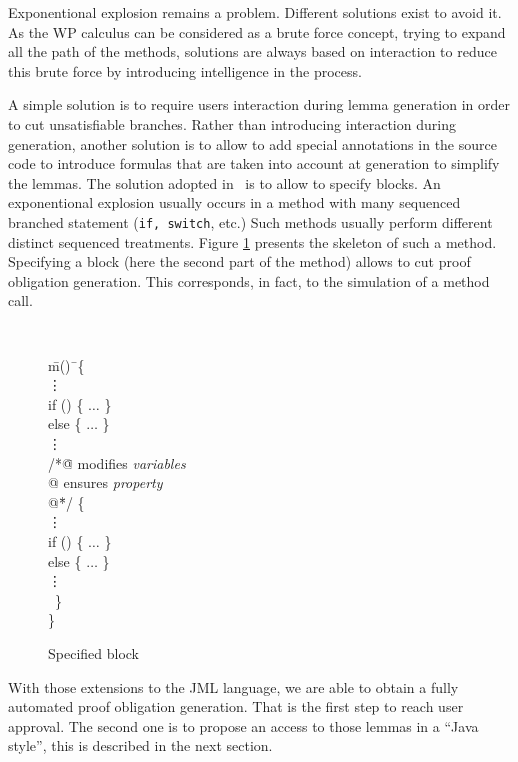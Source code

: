 Exponentional explosion remains a problem.  Different solutions exist
 to avoid it.  As the WP calculus can be considered as a brute
 force concept, trying to expand all the path of the methods,
 solutions are always based on interaction to reduce this brute force
 by introducing intelligence in the process.

 A simple solution is to require users interaction during lemma
 generation in order to cut unsatisfiable branches.  Rather than introducing
 interaction during generation, another solution is to allow to add
 special annotations in the source code to introduce formulas that are
 taken into account at generation to simplify the lemmas.
 The solution adopted in \JACK\ is to allow to specify blocks. An exponentional explosion usually occurs
in a method with many sequenced branched statement ({\tt if, switch}, etc.) Such methods usually perform
different distinct sequenced treatments.
 Figure \ref{Specified_block} presents the skeleton of such a method. Specifying a block (here the second part
of the method) allows to cut proof obligation generation. This corresponds, in fact, to the simulation of a
method call.
\begin{figure}[htp]
{\tt
\begin{tabbing}
 \hspace{3 cm} \=m()\= \ \{ \\
 \> \> \vdots \\
 \> \> if () \{ $\hdots$ \} \\
 \> \> else \{ $\hdots$ \}   \\
 \> \> \vdots                   \\
 \> \> /*\=@ modifies {\it variables}  \\
 \> \> \> @ ensures {\it property} \\
 \> \> \> @\=*/ \{ \\
 \> \> \> \> \vdots \\
 \> \> \> \> if () \{ $\hdots$ \} \\
 \> \> \> \> else \{ $\hdots$ \}   \\
 \> \> \> \> \vdots                   \\
 \> \> \ \} \\
 \> \> \}
\end{tabbing}
}
 \caption{Specified block}
 \label{Specified_block}
\end{figure}

 With those extensions to the JML language, we are able to obtain a fully automated proof obligation generation.
That is the first step to reach user approval. The second one is to propose an access to those lemmas in a
``Java style'', this is described in the next section.
